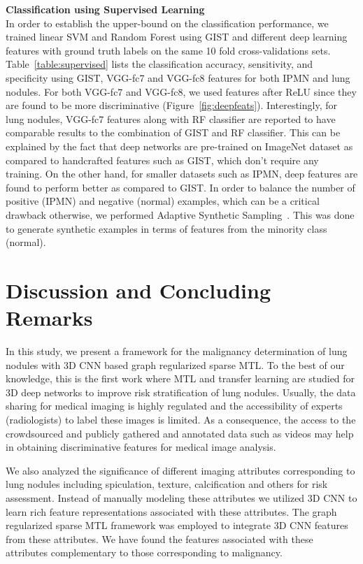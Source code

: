 \documentclass[journal]{IEEEtran}
\begin{document}
\noindent\textbf{Classification using Supervised Learning}\\
\noindent In order to establish the upper-bound on the classification performance, we trained linear SVM and Random Forest using GIST and different deep learning features with ground truth labels on the same 10 fold cross-validations sets. Table~\ref{table:supervised} lists the classification accuracy, sensitivity, and specificity using GIST, VGG-fc7 and VGG-fc8 features for both IPMN and lung nodules. For both VGG-fc7 and VGG-fc8, we used features after ReLU since they are found to be more discriminative (Figure~\ref{fig:deepfeats}). Interestingly, for lung nodules, VGG-fc7 features along with RF classifier are reported to have comparable results to the combination of GIST and RF classifier. This can be explained by the fact that deep networks are pre-trained on ImageNet dataset as compared to handcrafted features such as GIST, which don't require any training. On the other hand, for smaller datasets such as IPMN, deep features are found to perform better as compared to GIST. In order to balance the number of positive (IPMN) and negative (normal) examples, which can be a critical drawback otherwise, we performed Adaptive Synthetic Sampling~\cite{he2008adasyn}. This was done to generate synthetic examples in terms of features from the minority class (normal).\\

\section{Discussion and Concluding Remarks}
In this study, we present a framework for the malignancy determination of lung nodules with 3D CNN based graph regularized sparse MTL. To the best of our knowledge, this is the first work where MTL and transfer learning are studied for 3D deep networks to improve risk stratification of lung nodules. Usually, the data sharing for medical imaging is highly regulated and the accessibility of experts (radiologists) to label these images is limited. As a consequence, the access to the crowdsourced and publicly gathered and annotated data such as videos may help in obtaining discriminative features for medical image analysis. 

We also analyzed the significance of different imaging attributes corresponding to lung nodules including spiculation, texture, calcification and others for risk assessment. Instead of manually modeling these attributes we utilized 3D CNN to learn rich feature representations associated with these attributes. The graph regularized sparse MTL framework was employed to integrate 3D CNN features from these attributes. We have found the features associated with these attributes complementary to those corresponding to malignancy.
\end{document}
